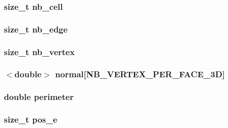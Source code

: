 \label{de/df5/classFVFace3D_a21a17acd25e8b790315d31bb141824f8}
\hypertarget{classFVFace3D_a1a5a11cfc8bbaa0cf132759c0382da70}{
\subsubsection[{nb\_\-cell}]{\setlength{\rightskip}{0pt plus 5cm}size\_\-t {\bf nb\_\-cell}}}
\label{de/df5/classFVFace3D_a1a5a11cfc8bbaa0cf132759c0382da70}
\hypertarget{classFVFace3D_a71d1c26cc375a03060b9eb8453a3680a}{
\subsubsection[{nb\_\-edge}]{\setlength{\rightskip}{0pt plus 5cm}size\_\-t {\bf nb\_\-edge}}}
\label{de/df5/classFVFace3D_a71d1c26cc375a03060b9eb8453a3680a}
\hypertarget{classFVFace3D_a0a063e99fbc85e837d93dfbcda6f5252}{
\subsubsection[{nb\_\-vertex}]{\setlength{\rightskip}{0pt plus 5cm}size\_\-t {\bf nb\_\-vertex}}}
\label{de/df5/classFVFace3D_a0a063e99fbc85e837d93dfbcda6f5252}
\hypertarget{classFVFace3D_aa492e5327e0487055f0a989431eefc0d}{
\subsubsection[{normal}]{$<$double$>$ {\bf normal}\mbox{[}NB\_\-VERTEX\_\-PER\_\-FACE\_\-3D\mbox{]}}}
\label{de/df5/classFVFace3D_aa492e5327e0487055f0a989431eefc0d}
\hypertarget{classFVFace3D_a079d8fd569c3406fb63e0511eb0338c0}{
\subsubsection[{perimeter}]{\setlength{\rightskip}{0pt plus 5cm}double {\bf perimeter}}}
\label{de/df5/classFVFace3D_a079d8fd569c3406fb63e0511eb0338c0}
\hypertarget{classFVFace3D_a6320f7771a5dd32537e636a23fbf7e7c}{
\subsubsection[{pos\_\-e}]{\setlength{\rightskip}{0pt plus 5cm}size\_\-t {\bf pos\_\-e}}}
